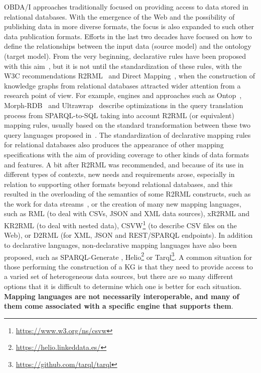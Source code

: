 OBDA/I approaches traditionally focused on providing access to data stored in relational databases. With the emergence of the Web and the possibility of publishing data in more diverse formats, the focus is also expanded to such other data publication formats. Efforts in the last two decades have focused on how to define the relationships between the input data (source model) and the ontology (target model). From the very beginning, declarative rules have been proposed with this aim~\citep{barrasa2004r2o,bizer2004d2rq,auer2009triplify}, but it is not until the standardization of these rules, with the W3C recommendations R2RML~\citep{R2RML} and Direct Mapping~\citep{arenas2013direct}, when the construction of knowledge graphs from relational databases attracted wider attention from a research point of view. For example, engines and approaches such as Ontop~\citep{calvanese2017ontop}, Morph-RDB~\citep{priyatna2014formalisation} and Ultrawrap~\citep{sequeda2013ultrawrap} describe optimizations in the query translation process from SPARQL-to-SQL taking into account R2RML (or equivalent) mapping rules, usually based on the standard transformation between these two query languages proposed in~\citep{chebotko2009semantics, elliott2009complete}. The standardization of declarative mapping rules for relational databases also produces the appearance of other mapping specifications with the aim of providing coverage to other kinds of data formats and features. A bit after R2RML was recommended, and because of its use in different types of contexts, new needs and requirements arose, especially in relation to supporting other formats beyond relational databases, and this resulted in the overloading of the semantics of some R2RML constructs, such as the work for data streams~\citep{calbimonte2010enabling}, or the creation of many new mapping languages, such as RML \citep{dimou2014rml} (to deal with CSVs, JSON and XML data sources), xR2RML \citep{michel2015translation} and  KR2RML \citep{slepicka2015kr2rml} (to deal with nested data), CSVW\footnote{\url{https://www.w3.org/ns/csvw}} (to describe CSV files on the Web), or D2RML \citep{chortaras2018d2rml} (for XML, JSON and REST/SPARQL endpoints). In addition to declarative languages, non-declarative mapping languages have also been proposed, such as SPARQL-Generate \citep{lefranccois2017sparql}, Helio\footnote{\url{https://helio.linkeddata.es/}} or  Tarql\footnote{\url{https://github.com/tarql/tarql}}. A common situation for those performing the construction of a KG is that they need to provide access to a varied set of heterogeneous data sources, but there are so many different options that it is difficult to determine which one is better for each situation. \textbf{Mapping languages are not necessarily interoperable, and many of them come associated with a specific engine that supports them}.

